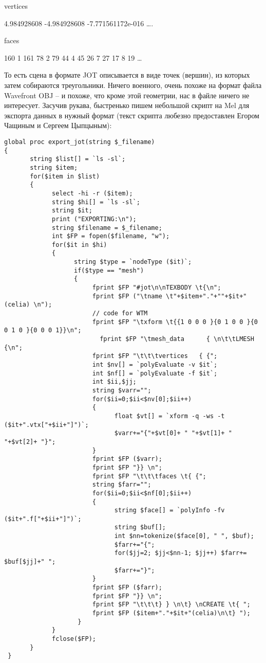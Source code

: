  vertices           { {{4.984928608 -4.984928608 -7.771561172e-016} ….
  

 faces    { {{160 1 161 }{78 2 79 }{44 4 45 }{26 7 27 }{17 8 19 }…
  

 То есть сцена в формате JOT описывается в виде
    точек (вершин), из которых затем собираются треугольники. Ничего
    военного, очень похоже на формат файла Wavefront OBJ – и похоже,
    что кроме этой геометрии, нас в файле ничего не интересует. Засучив
    рукава, быстренько пишем небольшой скрипт на Mel для экспорта
    данных в нужный формат (текст скрипта любезно предоставлен Егором
    Чащиным и Сергеем Цыпцыным):
  
\begin{lstlisting}[frame=single, framerule=0pt, framesep=10pt, xleftmargin=10pt, xrightmargin=10pt]
global proc export_jot(string $_filename)
{
       string $list[] = `ls -sl`;
       string $item;
       for($item in $list)
       {
             select -hi -r ($item);
             string $hi[] = `ls -sl`;
             string $it;
             print ("EXPORTING:\n");
             string $filename = $_filename;
             int $FP = fopen($filename, "w");
             for($it in $hi)
             {
                   string $type = `nodeType ($it)`;
                   if($type == "mesh")
                   {                                       
                        fprint $FP "#jot\n\nTEXBODY \t{\n";
                        fprint $FP ("\tname \t"+$item+"."+""+$it+"(celia) \n");
                        // code for WTM
                        fprint $FP "\txform \t{{1 0 0 0 }{0 1 0 0 }{0 0 1 0 }{0 0 0 1}}\n";
                          fprint $FP "\tmesh_data      { \n\t\tLMESH     {\n";
                        fprint $FP "\t\t\tvertices   { {";
                        int $nv[] = `polyEvaluate -v $it`;
                        int $nf[] = `polyEvaluate -f $it`;
                        int $ii,$jj;
                        string $varr="";
                        for($ii=0;$ii<$nv[0];$ii++)
                        {
                              float $vt[] = `xform -q -ws -t ($it+".vtx["+$ii+"]")`;
                              $varr+="{"+$vt[0]+ " "+$vt[1]+ " "+$vt[2]+ "}";
                        }
                        fprint $FP ($varr);
                        fprint $FP "}} \n";                     
                        fprint $FP "\t\t\tfaces \t{ {";
                        string $farr="";
                        for($ii=0;$ii<$nf[0];$ii++)
                        {
                              string $face[] = `polyInfo -fv ($it+".f["+$ii+"]")`;
                              string $buf[];
                              int $nn=tokenize($face[0], " ", $buf);
                              $farr+="{";
                              for($jj=2; $jj<$nn-1; $jj++) $farr+= $buf[$jj]+" ";
                              $farr+="}";
                        }
                        fprint $FP ($farr);   
                        fprint $FP "}} \n";
                        fprint $FP "\t\t\t} } \n\t} \nCREATE \t{ ";
                        fprint $FP ($item+"."+$it+"(celia)\n\t} ");                    
                    }
             }
             fclose($FP);     
       }
 }
\end{lstlisting}
  

}}}}

